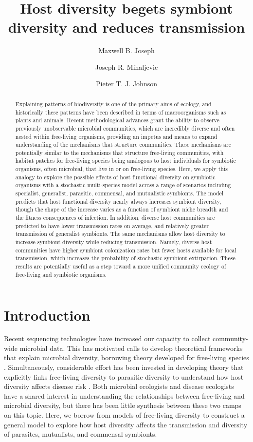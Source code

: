 \documentclass[12pt]{article}
\title{Host diversity begets symbiont diversity and reduces transmission}
\author[1]{Maxwell B. Joseph}
\author[2]{Joseph R. Mihaljevic}
\author[1]{Pieter T. J. Johnson}
\affil[1]{Ecology and Evolutionary Biology, University of Colorado, Boulder, CO}
\affil[2]{Ecology and Evolution, University of Chicago, IL}
\date{}
\begin{document}
\maketitle

\begin{abstract}
Explaining patterns of biodiversity is one of the primary aims of ecology, and historically these patterns have been described in terms of macroorganisms such as plants and animals. 
Recent methodological advances grant the ability to observe previously unobservable microbial communities, which are incredibly diverse and often nested within free-living organisms, providing an impetus and means to expand understanding of the mechanisms that structure communities. 
These mechanisms are potentially similar to the mechanisms that structure free-living communities, with habitat patches for free-living species being analogous to host individuals for symbiotic organisms, often microbial, that live in or on free-living species.
Here, we apply this analogy to explore the possible effects of host functional diversity on symbiotic organisms with a stochastic multi-species model across a range of scenarios including specialist, generalist, parasitic, commensal, and mutualistic symbionts. 
The model predicts that host functional diversity nearly always increases symbiont diversity, though the shape of the increase varies as a function of symbiont niche breadth and the fitness consequences of infection. 
In addition, diverse host communities are predicted to have lower transmission rates on average, and relatively greater transmission of generalist symbionts. 
The same mechanisms allow host diversity to increase symbiont diversity while reducing transmission.
Namely, diverse host communities have higher symbiont colonization rates but fewer hosts available for local transmission, which increases the probability of stochastic symbiont extirpation.
These results are potentially useful as a step toward a more unified community ecology of free-living and symbiotic organisms.
\end{abstract}

\section*{Introduction}

Recent sequencing technologies have increased our capacity to collect community-wide microbial data. 
This has motivated calls to develop theoretical frameworks that explain microbial diversity, borrowing theory developed for free-living species \citep{Prosser2007}. 
Simultaneously, considerable effort has been invested in developing theory that explicitly links free-living diversity to parasitic diversity to understand how host diversity affects disease risk \citep{Dobson2004a, Roche2012, Joseph2013a, Mihaljevic2014}. 
Both microbial ecologists and disease ecologists have a shared interest in understanding the relationships between free-living and microbial diversity, but there has been little synthesis between these two camps on this topic. 
Here, we borrow from models of free-living diversity to construct a general model to explore how host diversity affects the transmission and diversity of parasites, mutualists, and commensal symbionts.
\end{document}
